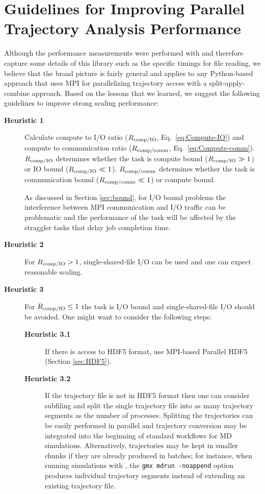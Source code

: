 
\section{Guidelines for Improving Parallel Trajectory Analysis Performance}
\label{sec:guidelines}

Although the performance measurements were performed with  and therefore capture some details of this library such as the specific timings for file reading, we believe that the broad picture is fairly general and applies to any Python-based approach that uses MPI for parallelizing trajectory access with a split-apply-combine approach.
Based on the lessons that we learned, we suggest the following guidelines to improve strong scaling performance:
\begin{description}
\item[\textbf{Heuristic 1}] Calculate compute to I/O ratio ($R_{\text{comp/IO}}$, Eq.~\ref{eq:Compute-IO}) and compute to communication ratio ($R_{\text{comp/comm}}$, Eq.~\ref{eq:Compute-comm}).
  $R_{\text{comp/IO}}$ determines whether the task is compute bound ($R_{\text{comp/IO}} \gg 1$) or IO bound ($R_{\text{comp/IO}} \ll 1$).
  $R_{\text{comp/comm}}$ determines whether the task is communication bound ($R_{\text{comp/comm}} \ll 1$) or compute bound.

  As discussed in Section \ref{sec:bound}, for I/O bound problems the interference between MPI communication and I/O traffic can be problematic \cite{VMD2013, Brown:2018ab} and the performance of the task will be affected by the straggler tasks that delay job completion time.
  
\item[\textbf{Heuristic 2}] For $R_{\text{comp/IO}} > 1$, single-shared-file I/O can be used and one can expect reasonable scaling.
\item[\textbf{Heuristic 3}] For $R_{\text{comp/IO}} \le 1$ the task is I/O bound and single-shared-file I/O should be avoided.
  One might want to consider the following steps:  
  \begin{description}
    \item[\textbf{Heuristic 3.1}] If there is access to HDF5 format, use MPI-based Parallel HDF5 (Section \ref{sec:HDF5}). 
    \item[\textbf{Heuristic 3.2}] If the trajectory file is not in HDF5 format then one can consider subfiling and split the single trajectory file into as many trajectory segments as the number of processes.
      Splitting the trajectories can be easily performed in parallel and trajectory conversion may be integrated into the beginning of standard workflows for MD simulations.
      Alternatively, trajectories may be kept in smaller chunks if they are already produced in batches; for instance, when running simulations with  \cite{Abraham:2015aa}, the \texttt{gmx mdrun -noappend} option produces individual trajectory segments instead of extending an existing trajectory file.
  \end{description}
\end{description}
